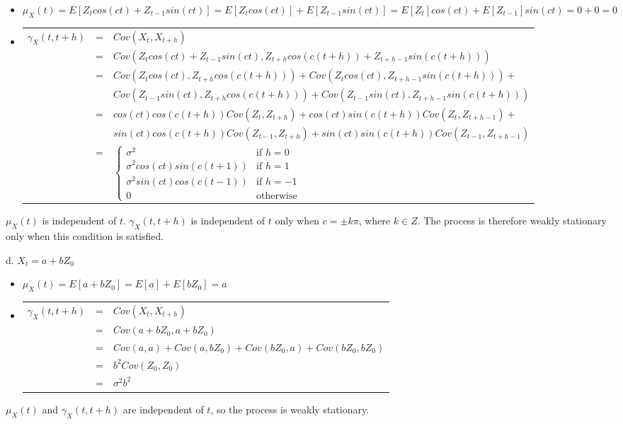 \documentclass[]{article}
\begin{document}
\color{blue}
\begin{itemize}
\item $\mu_X(t) = E[Z_t cos(ct) + Z_{t-1} sin(ct)]
                = E[Z_t cos(ct)] + E[Z_{t-1} sin(ct)]
                = E[Z_t] cos(ct) + E[Z_{t-1}] sin(ct)
                = 0 + 0
                = 0$
\item
\begin{tabular}{ccl}
$\gamma_X(t, t+h)$ & = & $Cov(X_t, X_{t+h})$\\
                  & = & $Cov(Z_t cos(ct) + Z_{t-1} sin(ct), Z_{t+h} cos(c(t+h)) + Z_{t+h-1} sin(c(t+h)))$\\
                  & = & $Cov(Z_t cos(ct), Z_{t+h} cos(c(t+h))) + Cov(Z_t cos(ct), Z_{t+h-1} sin(c(t+h))) +$\\
                  &   & $Cov(Z_{t-1} sin(ct), Z_{t+h} cos(c(t+h))) + Cov(Z_{t-1} sin(ct), Z_{t+h-1} sin(c(t+h)))$\\
                  & = & $cos(ct) cos(c(t+h)) Cov(Z_t, Z_{t+h}) + cos(ct) sin(c(t+h)) Cov(Z_t, Z_{t+h-1}) +$\\
                  &   & $sin(ct) cos(c(t+h)) Cov(Z_{t-1}, Z_{t+h}) + sin(ct) sin(c(t+h)) Cov(Z_{t-1}, Z_{t+h-1})$\\
                  & = & $\begin{cases} \sigma^2 & \mbox{if } h=0\\ \sigma^2 cos(ct) sin(c(t+1)) & \mbox{if } h = 1\\ \sigma^2 sin(ct) cos(c(t-1)) & \mbox{if } h = -1 \\ 0 & \mbox{otherwise} \end{cases}$\\
\end{tabular}
\end{itemize}
$\mu_X(t)$ is independent of $t$. $\gamma_X(t, t+h)$ is independent of $t$ only when $c = \pm k\pi$, where $k \in Z$. The process is therefore weakly stationary only when this condition is satisfied.
\color{black}

d. $X_t = a + bZ_0$

\color{blue}
\begin{itemize}
\item $\mu_X(t) = E[a + bZ_0]
                = E[a] + E[bZ_0]
                = a$
\item 
\begin{tabular}{ccl}
$\gamma_X(t, t+h)$ & = & $Cov(X_t, X_{t+h})$\\
                  & = & $Cov(a + bZ_0, a + bZ_0)$\\
                  & = & $Cov(a, a) + Cov(a, bZ_0) + Cov(bZ_0, a) + Cov(bZ_0, bZ_0)$\\
                  & = & $b^2Cov(Z_0, Z_0)$\\
                  & = & $\sigma^2 b^2$\\
\end{tabular}
\end{itemize}
$\mu_X(t)$ and $\gamma_X(t, t+h)$ are independent of $t$, so the process is weakly stationary.
\color{black}
\end{document}
